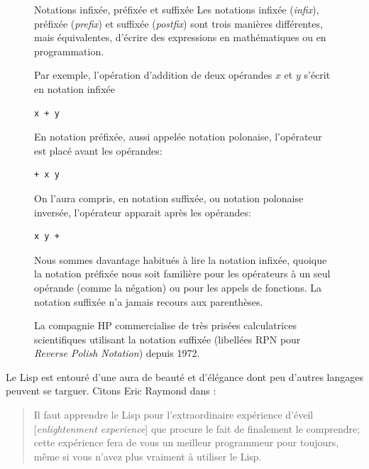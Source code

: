 \begin{figure}[t]
  \label{fig:informatique:notations}
  \setlength{\FrameRule}{1pt}
  \begin{emphbox}{\mdseries Notations infixée, préfixée et suffixée}
    Les notations infixée (\emph{infix}),
    préfixée (\emph{prefix}) et
    suffixée (\emph{postfix}) sont trois
    manières différentes, mais équivalentes, d'écrire des expressions
    en mathématiques ou en programmation.

    Par exemple, l'opération d'addition de deux opérandes $x$ et $y$
    s'écrit en notation infixée
\begin{lstlisting}
x + y
\end{lstlisting}
    En notation préfixée, aussi appelée notation polonaise,
    l'opérateur est placé avant les opérandes:
\begin{lstlisting}
+ x y
\end{lstlisting}
    On l'aura compris, en notation suffixée, ou notation polonaise
    inversée, l'opérateur apparait après les opérandes:
\begin{lstlisting}
x y +
\end{lstlisting}
    Nous sommes davantage habitués à lire la notation infixée, quoique
    la notation préfixée nous soit familière pour les opérateurs à un
    seul opérande (comme la négation) ou pour les appels de fonctions.
    La notation suffixée n'a jamais recours aux parenthèses.

    La compagnie HP commercialise de très prisées calculatrices
    scientifiques utilisant la notation suffixée (libellées RPN pour
    \emph{Reverse Polish Notation}) depuis 1972.
  \end{emphbox}
\end{figure}

Le Lisp est entouré d'une aura de beauté et d'élégance dont peu
d'autres langages peuvent se targuer. Citons Eric Raymond dans
:
\begin{quote}
  Il faut apprendre le Lisp pour l'extraordinaire expérience d'éveil
  [\emph{enlightenment experience}] que procure le fait de finalement
  le comprendre; cette expérience fera de vous un meilleur programmeur
  pour toujours, même si vous n'avez plus vraiment à utiliser le Lisp.
\end{quote}

